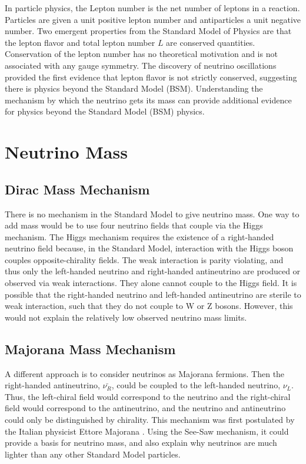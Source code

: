 


In particle physics, the Lepton number is the net number of leptons in a reaction. Particles are given a unit positive lepton number and antiparticles a unit negative number. Two emergent properties from the Standard Model of Physics are that the lepton flavor and total lepton number \( L \) are conserved quantities. Conservation of the lepton number has no theoretical motivation and is not associated with any gauge symmetry. The discovery of neutrino oscillations provided the first evidence that lepton flavor is not strictly conserved, suggesting there is physics beyond the Standard Model (BSM). Understanding the mechanism by which the neutrino gets its mass can provide additional evidence for physics beyond the Standard Model (BSM) physics. 

\section{Neutrino Mass}
\subsection{Dirac Mass Mechanism}
There is no mechanism in the Standard Model to give neutrino mass. One way to add mass would be to use four neutrino fields that couple via the Higgs mechanism. The Higgs mechanism requires the existence of a right-handed neutrino field because, in the Standard Model, interaction with the Higgs boson couples opposite-chirality fields. The weak interaction is parity violating, and thus only the left-handed neutrino and right-handed antineutrino are produced or observed via weak interactions. They alone cannot couple to the Higgs field. It is possible that the right-handed neutrino and left-handed antineutrino are sterile to weak interaction, such that they do not couple to W or Z bosons. However, this would not explain the relatively low observed neutrino mass limits. 

\subsection{Majorana Mass Mechanism}
A different approach is to consider neutrinos as Majorana fermions. Then the right-handed antineutrino, $\bar{\nu_R}$, could be coupled to the left-handed neutrino, $\nu_L$. Thus, the left-chiral field would correspond to the neutrino and the right-chiral field would correspond to the antineutrino, and the neutrino and antineutrino could only be distinguished by chirality. This mechanism was first postulated by the Italian physicist Ettore Majorana \cite{Majorana_1937}. Using the See-Saw mechanism, it could provide a basis for neutrino mass, and also explain why neutrinos are much lighter than any other Standard Model particles.

